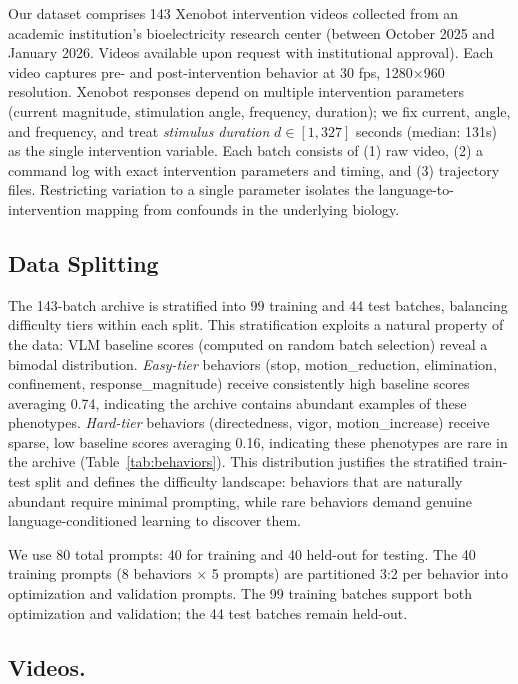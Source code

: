 \documentclass{article}
\begin{document}
Our dataset comprises 143 Xenobot intervention videos collected from an academic institution's bioelectricity research center
(between October 2025 and January 2026. Videos available upon request with institutional approval). Each video captures pre- and post-intervention 
behavior at 30 fps, 1280×960 resolution. Xenobot responses depend on multiple intervention parameters (current magnitude, stimulation angle, frequency, duration); we fix current, angle, and frequency, and treat \textit{stimulus duration} $d \in [1, 327]$ seconds (median: 131s) as the single intervention variable. Each batch consists of (1) raw video, (2) a command log with exact intervention parameters and timing, and (3) trajectory files. Restricting variation to a single parameter isolates the language-to-intervention mapping from confounds in the underlying biology.

\subsection{Data Splitting}
\label{sec:split}

The 143-batch archive is stratified into 99 training and 44 test batches, balancing difficulty tiers within each split. This stratification exploits a natural property of the data: VLM baseline scores (computed on random batch selection) reveal a bimodal distribution. \textit{Easy-tier} behaviors (stop, motion\_reduction, elimination, confinement, response\_magnitude) receive consistently high baseline scores averaging 0.74, indicating the archive contains abundant examples of these phenotypes. \textit{Hard-tier} behaviors (directedness, vigor, motion\_increase) receive sparse, low baseline scores averaging 0.16, indicating these phenotypes are rare in the archive (Table~\ref{tab:behaviors}). This distribution justifies the stratified train-test split and defines the difficulty landscape: behaviors that are naturally abundant require minimal prompting, while rare behaviors demand genuine language-conditioned learning to discover them.

We use 80 total prompts: 40 for training and 40 held-out for testing. The 40 training prompts (8 behaviors $\times$ 5 prompts) are partitioned 3:2 per behavior into optimization and validation prompts. The 99 training batches support both optimization and validation; the 44 test batches remain held-out.

\subsection{Videos.}
\label{videos}
\end{document}
